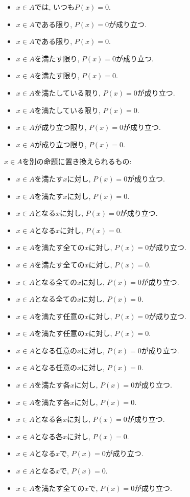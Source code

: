 \documentclass[a4paper,12pt,draft]{amsart}
\begin{document}
\begin{itemize}
\item $x\in A$では, いつも$P(x)=0$.
\item $x\in A$である限り, $P(x)=0$が成り立つ.
\item $x\in A$である限り, $P(x)=0$.
\item $x\in A$を満たす限り, $P(x)=0$が成り立つ.
\item $x\in A$を満たす限り, $P(x)=0$.
\item $x\in A$を満たしている限り, $P(x)=0$が成り立つ.
\item $x\in A$を満たしている限り, $P(x)=0$.
\item $x\in A$が成り立つ限り, $P(x)=0$が成り立つ.
\item $x\in A$が成り立つ限り, $P(x)=0$.
\end{itemize}
$x\in A$を別の命題に置き換えられるもの:
\begin{itemize}
\item $x\in A$を満たす$x$に対し, $P(x)=0$が成り立つ.
\item $x\in A$を満たす$x$に対し, $P(x)=0$.
\item $x\in A$となる$x$に対し, $P(x)=0$が成り立つ.
\item $x\in A$となる$x$に対し, $P(x)=0$.
\item $x\in A$を満たす全ての$x$に対し, $P(x)=0$が成り立つ.
\item $x\in A$を満たす全ての$x$に対し, $P(x)=0$.
\item $x\in A$となる全ての$x$に対し, $P(x)=0$が成り立つ.
\item $x\in A$となる全ての$x$に対し, $P(x)=0$.
\item $x\in A$を満たす任意の$x$に対し, $P(x)=0$が成り立つ.
\item $x\in A$を満たす任意の$x$に対し, $P(x)=0$.
\item $x\in A$となる任意の$x$に対し, $P(x)=0$が成り立つ.
\item $x\in A$となる任意の$x$に対し, $P(x)=0$.
\item $x\in A$を満たす各$x$に対し, $P(x)=0$が成り立つ.
\item $x\in A$を満たす各$x$に対し, $P(x)=0$.
\item $x\in A$となる各$x$に対し, $P(x)=0$が成り立つ.
\item $x\in A$となる各$x$に対し, $P(x)=0$.
\item $x\in A$となる$x$で, $P(x)=0$が成り立つ.
\item $x\in A$となる$x$で, $P(x)=0$.
\item $x\in A$を満たす全ての$x$で, $P(x)=0$が成り立つ.

\end{itemize}
\end{document}
